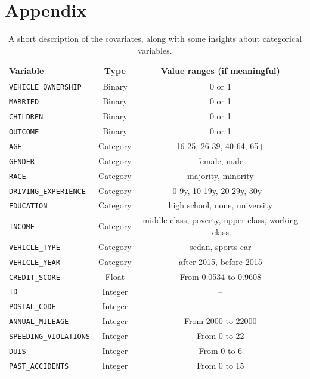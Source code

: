 \documentclass[a4paper,11pt, titlepage]{article}
\begin{document}
\appendix


\section{Appendix}


\begin{table}[ht]
    \begin{tabular}[t]{|lcc|}
        \rowcolor{orange!30}
\hline
\textbf{Variable}           & \textbf{Type}      & \textbf{Value ranges (if meaningful)}     \\
\hline
{\tt VEHICLE\_OWNERSHIP}   & Binary    & 0 or 1                     \\
{\tt MARRIED}             & Binary    & 0 or 1                     \\
{\tt CHILDREN}            & Binary    & 0 or 1                    \\
{\tt OUTCOME}             & Binary    & 0 or 1                     \\
{\tt AGE}                 & Category    & 16-25, 26-39, 40-64, 65+      \\
{\tt GENDER}              & Category    & female, male                  \\
{\tt RACE}                & Category    & majority, minority            \\
{\tt DRIVING\_EXPERIENCE}  & Category    & 0-9y, 10-19y, 20-29y, 30y+     \\
{\tt EDUCATION}           & Category    & high school, none, university \\
{\tt INCOME}              & Category    & middle class, poverty, upper class, working class \\
{\tt VEHICLE\_TYPE}        & Category    & sedan, sports car             \\
{\tt VEHICLE\_YEAR}        & Category    & after 2015, before 2015       \\
{\tt CREDIT\_SCORE}        & Float     & From 0.0534 to 0.9608       \\
{\tt ID}                  & Integer   & --                \\
{\tt POSTAL\_CODE}         & Integer   & --             \\ 
{\tt ANNUAL\_MILEAGE}      & Integer   & From 2000 to 22000               \\ 

{\tt SPEEDING\_VIOLATIONS} & Integer   & From 0 to 22                   \\
{\tt DUIS}                & Integer   & From 0 to 6                      \\ 
{\tt PAST\_ACCIDENTS}      & Integer   & From 0 to 15                    \\  

\hline
    \end{tabular}
\centering
\caption{A short description of the covariates, along with some insights about categorical variables.}
\label{data-description}
\end{table}%
\end{document}
